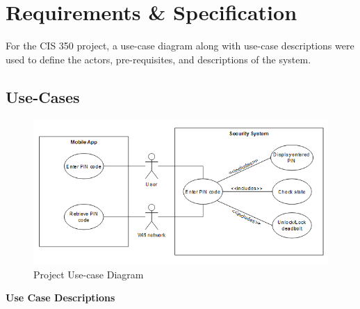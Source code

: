 \chapter{Requirements \& Specification}


For the CIS 350 project, a use-case diagram along with use-case descriptions were used to define the actors, pre-requisites, and descriptions of the system. 

\section{Use-Cases}

\begin{figure}[htb]
    \centering
    \includegraphics[width = \textwidth]{Images/CIS 350 - Project - Use Case Diagram.png}
    \caption{Project Use-case Diagram}
    \label{fig:Use-case Diagram}
\end{figure}

\newpage \textbf{Use Case Descriptions}

